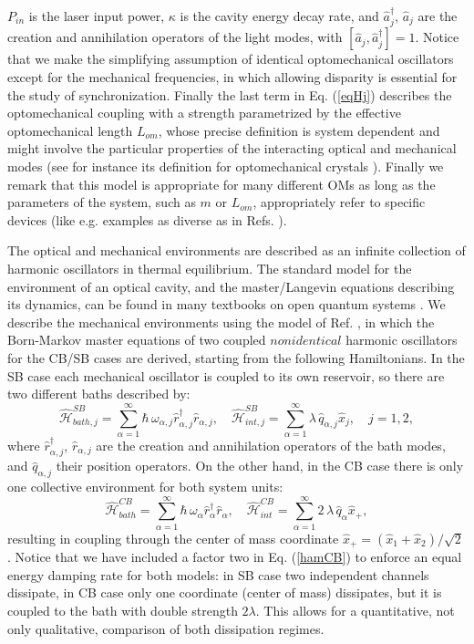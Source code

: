 \documentclass[a4paper]{jpconf}
\begin{document}
$P_{in}$ is the laser input power, $\kappa$ is the cavity energy decay rate, and 
$\hat{a}^{\dagger}_j$, $\hat{a}_j$ are the creation and annihilation operators of 
the light modes, with $[\hat{a}_j,\hat{a}^{\dagger}_j]=1$. 
 Notice that we make the simplifying assumption of 
identical optomechanical oscillators except for the mechanical frequencies, in 
which allowing disparity is essential for the study of synchronization. 
Finally the last term in Eq. (\ref{eqHj})
describes the optomechanical coupling with a strength parametrized by the 
effective optomechanical length $L_{om}$,  whose precise definition is system dependent and might involve the particular properties
of the interacting optical and mechanical modes (see for instance its definition for optomechanical crystals \cite{42}). Finally we remark that this model is appropriate for many different 
OMs as long as the parameters of the system, such as $m$ 
or $L_{om}$, appropriately refer to specific devices (like e.g. examples as diverse as in Refs. \cite{42,41}).

The optical and mechanical environments are described as an infinite collection 
of harmonic oscillators in thermal equilibrium. The standard model for the 
environment of an optical cavity, and the master/Langevin equations describing 
its dynamics, can be found in many textbooks on open quantum 
systems \cite{26,43,44}. We describe the mechanical environments 
using the model of Ref. \cite{45}, in which the Born-Markov master equations of 
two coupled $nonidentical$ harmonic oscillators for the CB/SB cases are derived,  
starting from the following Hamiltonians. 
In the SB case each mechanical oscillator is coupled to its own reservoir, 
so there are two different baths described by:
\begin{equation}
\hat{\mathcal{H}}^{SB}_{bath,j}=\sum^{\infty}_{\alpha=1} \hbar \, 
\omega_{\alpha,j}\hat{r}_{\alpha,j}^\dagger \hat{r}_{\alpha,j},\quad 
\hat{\mathcal{H}}^{SB}_{int,j}=\sum^{\infty}_{\alpha=1}  \lambda\, 
\hat{q}_{\alpha,j}\hat{x}_j, \quad j=1,2,
\end{equation}
where $\hat{r}_{\alpha,j}^\dagger$, $\hat{r}_{\alpha,j}$ are the creation and 
annihilation operators of the bath modes, and $\hat{q}_{\alpha,j}$ their 
position operators. On the other hand, in the CB case there is only one 
collective environment for both system units:
\begin{equation}\label{hamCB}
\hat{\mathcal{H}}^{CB}_{bath}=\sum^{\infty}_{\alpha=1} \hbar \, 
\omega_{\alpha}\hat{r}_{\alpha}^\dagger \hat{r}_{\alpha}, \quad 
\hat{\mathcal{H}}^{CB}_{int}=\sum^{\infty}_{\alpha=1} 2\, \lambda\, 
\hat{q}_{\alpha}\hat{x}_+,
\end{equation}
resulting in coupling through the center of mass coordinate  $\hat{x}_+=(\hat{x}_1+\hat{x}_2)/\sqrt{2}$ \cite{30,31,26,27,29,28,CB_ent,32}.
Notice that we have included a factor two in Eq. (\ref{hamCB}) to enforce an equal energy damping rate for both models: 
in SB case two independent channels dissipate, in CB case only one coordinate (center of mass) dissipates, but it is coupled
to the bath with double strength $2\lambda$. This allows for a quantitative, not only qualitative, comparison of both dissipation regimes.
\end{document}
